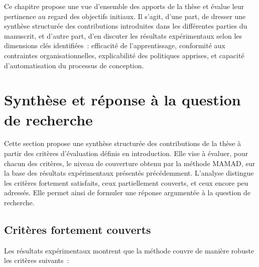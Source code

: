 Ce chapitre propose une vue d’ensemble des apports de la thèse et évalue leur pertinence au regard des objectifs initiaux. Il s’agit, d’une part, de dresser une synthèse structurée des contributions introduites dans les différentes parties du manuscrit, et d’autre part, d’en discuter les résultats expérimentaux selon les dimensions clés identifiées~: efficacité de l’apprentissage, conformité aux contraintes organisationnelles, explicabilité des politiques apprises, et capacité d’automatisation du processus de conception.

\section{Synthèse et réponse à la question de recherche}
\label{sec:synthese_recherche}

\noindent
Cette section propose une synthèse structurée des contributions de la thèse à partir des critères d’évaluation définis en introduction. Elle vise à évaluer, pour chacun des critères, le niveau de couverture obtenu par la méthode \ac{MAMAD}, sur la base des résultats expérimentaux présentés précédemment. L’analyse distingue les critères fortement satisfaits, ceux partiellement couverts, et ceux encore peu adressés. Elle permet ainsi de formuler une réponse argumentée à la question de recherche.

\subsection*{Critères fortement couverts}

Les résultats expérimentaux montrent que la méthode couvre de manière robuste les critères suivants~:

